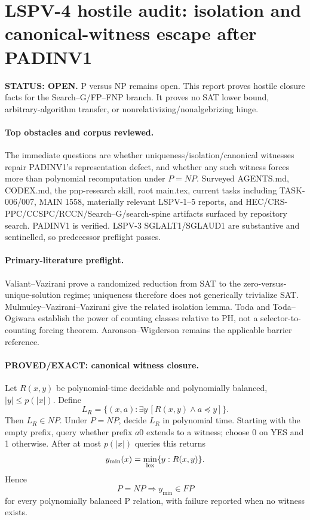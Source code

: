 \documentclass[11pt]{article}
\begin{document}
\section*{LSPV-4 hostile audit: isolation and canonical-witness escape after PADINV1}
\textbf{STATUS: OPEN.} P versus NP remains open. This report proves hostile closure facts for the Search--G/FP--FNP branch. It proves no SAT lower bound, arbitrary-algorithm transfer, or nonrelativizing/nonalgebrizing hinge.

\paragraph{Top obstacles and corpus reviewed.} The immediate questions are whether uniqueness/isolation/canonical witnesses repair PADINV1's representation defect, and whether any such witness forces more than polynomial recomputation under $P=NP$. Surveyed AGENTS.md, CODEX.md, the pnp-research skill, root main.tex, current tasks including TASK-006/007, MAIN 1558, materially relevant LSPV-1--5 reports, and HEC/CRS-PPC/CCSPC/RCCN/Search--G/search-spine artifacts surfaced by repository search. PADINV1 is verified. LSPV-3 SGLALT1/SGLAUD1 are substantive and sentinelled, so predecessor preflight passes.

\paragraph{Primary-literature preflight.} Valiant--Vazirani prove a randomized reduction from SAT to the zero-versus-unique-solution regime; uniqueness therefore does not generically trivialize SAT. Mulmuley--Vazirani--Vazirani give the related isolation lemma. Toda and Toda--Ogiwara establish the power of counting classes relative to PH, not a selector-to-counting forcing theorem. Aaronson--Wigderson remains the applicable barrier reference.

\paragraph{PROVED/EXACT: canonical witness closure.} Let $R(x,y)$ be polynomial-time decidable and polynomially balanced, $|y|\le p(|x|)$. Define
\[L_R=\{(x,a):\exists y\,[R(x,y)\wedge a\preceq y]\}.\]
Then $L_R\in NP$. Under $P=NP$, decide $L_R$ in polynomial time. Starting with the empty prefix, query whether prefix $a0$ extends to a witness; choose 0 on YES and 1 otherwise. After at most $p(|x|)$ queries this returns
\[y_{\min}(x)=\min_{\rm lex}\{y:R(x,y)\}.\]
Hence
\[\boxed{P=NP\Longrightarrow y_{\min}\in FP}\]
for every polynomially balanced P relation, with failure reported when no witness exists.
\end{document}
